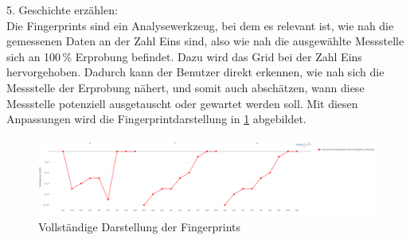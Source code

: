 5. Geschichte erzählen:\\
Die Fingerprints sind ein Analysewerkzeug, bei dem es relevant ist, wie nah die gemessenen Daten an der Zahl Eins sind, also wie nah die ausgewählte Messstelle sich an 100\,\% Erprobung befindet. Dazu wird das Grid bei der Zahl Eins hervorgehoben. Dadurch kann der Benutzer direkt erkennen, wie nah sich die Messstelle der Erprobung nähert, und somit auch abschätzen, wann diese Messstelle potenziell ausgetauscht oder gewartet werden soll. Mit diesen Anpassungen wird die Fingerprintdarstellung in \ref{fig:fingerprints_finished} abgebildet.
\begin{figure}[!h]
    \centering
    \includegraphics[width=1\linewidth]{gfx/fingerprints_finished.png}
    \caption{Vollständige Darstellung der Fingerprints}
    \label{fig:fingerprints_finished}
\end{figure}

